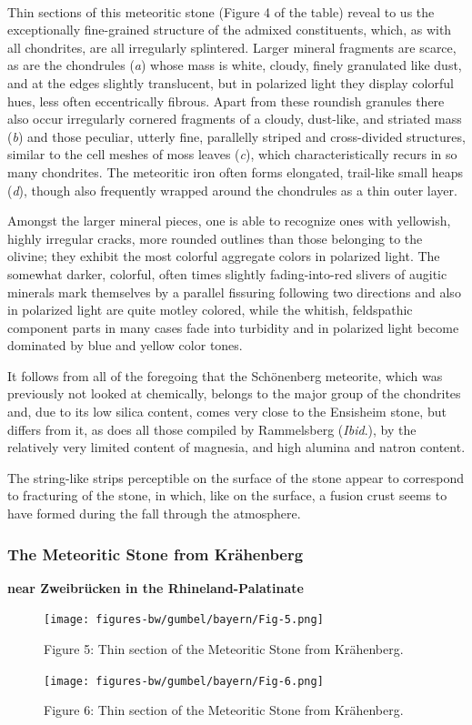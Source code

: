 \documentclass[a4paper, 12pt, oneside]{article}
\begin{document}
\paragraph*{}
Thin sections of this meteoritic stone (Figure 4 of the table) reveal to us the exceptionally fine-grained structure of the admixed constituents, which, as with all chondrites, are all irregularly splintered. Larger mineral fragments are scarce, as are the chondrules (\emph{a}) whose mass is white, cloudy, finely granulated like dust, and at the edges slightly translucent, but in polarized light they display colorful hues, less often eccentrically fibrous. Apart from these roundish granules there also occur irregularly cornered fragments of a cloudy, dust-like, and striated mass (\emph{b}) and those peculiar, utterly fine, parallelly striped and cross-divided structures, similar to the cell meshes of moss leaves (\emph{c}), which characteristically recurs in so many chondrites. The meteoritic iron often forms elongated, trail-like small heaps (\emph{d}), though also frequently wrapped around the chondrules as a thin outer layer.

Amongst the larger mineral pieces, one is able to recognize ones with yellowish, highly irregular cracks, more rounded outlines than those belonging to the olivine; they exhibit the most colorful aggregate colors in polarized light. The somewhat darker, colorful, often times slightly fading-into-red slivers of augitic minerals mark themselves by a parallel fissuring following two directions and also in polarized light are quite motley colored, while the whitish, feldspathic component parts in many cases fade into turbidity and in polarized light become dominated by blue and yellow color tones.

It follows from all of the foregoing that the Schönenberg meteorite, which was previously not looked at chemically, belongs to the major group of the chondrites and, due to its low silica content, comes very close to the Ensisheim stone, but differs from it, as does all those compiled by Rammelsberg (\emph{Ibid}.), by the relatively very limited content of magnesia, and high alumina and natron content.

The string-like strips perceptible on the surface of the stone appear to correspond to fracturing of the stone, in which, like on the surface, a fusion crust seems to have formed during the fall through the atmosphere.
\clearpage

\subsubsection{The Meteoritic Stone from Krähenberg}
\textbf{near Zweibrücken in the Rhineland-Palatinate}
\begin{figure}[h]
\centering
\texttt{[image: figures-bw/gumbel/bayern/Fig-5.png]}
\caption{Figure 5: Thin section of the Meteoritic Stone from Krähenberg.}
\end{figure}
\begin{figure}[h]
\centering
\texttt{[image: figures-bw/gumbel/bayern/Fig-6.png]}
\caption{Figure 6: Thin section of the Meteoritic Stone from Krähenberg.}
\end{figure}
\end{document}

